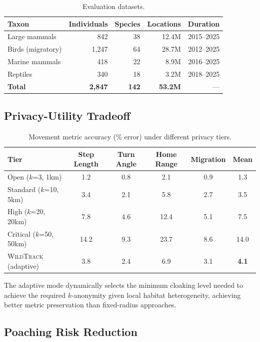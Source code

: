 \documentclass[11pt,letterpaper]{article}
\newcommand{\WildTrack}{\textsc{WildTrack}}
\begin{document}
\begin{table}[htbp]
\centering
\caption{Evaluation datasets.}
\label{tab:eval_datasets}
\begin{tabular}{lrrrr}
\toprule
\textbf{Taxon} & \textbf{Individuals} & \textbf{Species} & \textbf{Locations} & \textbf{Duration} \\
\midrule
Large mammals & 842 & 38 & 12.4M & 2015--2025 \\
Birds (migratory) & 1,247 & 64 & 28.7M & 2012--2025 \\
Marine mammals & 418 & 22 & 8.9M & 2016--2025 \\
Reptiles & 340 & 18 & 3.2M & 2018--2025 \\
\midrule
\textbf{Total} & \textbf{2,847} & \textbf{142} & \textbf{53.2M} & --- \\
\bottomrule
\end{tabular}
\end{table}

\subsection{Privacy-Utility Tradeoff}

\begin{table}[htbp]
\centering
\caption{Movement metric accuracy (\% error) under different privacy tiers.}
\label{tab:privacy_utility}
\begin{tabular}{lccccc}
\toprule
\textbf{Tier} & \textbf{Step Length} & \textbf{Turn Angle} & \textbf{Home Range} & \textbf{Migration} & \textbf{Mean} \\
\midrule
Open ($k$=3, 1km) & 1.2 & 0.8 & 2.1 & 0.9 & 1.3 \\
Standard ($k$=10, 5km) & 3.4 & 2.1 & 5.8 & 2.7 & 3.5 \\
High ($k$=20, 20km) & 7.8 & 4.6 & 12.4 & 5.1 & 7.5 \\
Critical ($k$=50, 50km) & 14.2 & 9.3 & 23.7 & 8.6 & 14.0 \\
\midrule
\WildTrack{} (adaptive) & 3.8 & 2.4 & 6.9 & 3.1 & \textbf{4.1} \\
\bottomrule
\end{tabular}
\end{table}

The adaptive mode dynamically selects the minimum cloaking level needed to achieve the required $k$-anonymity given local habitat heterogeneity, achieving better metric preservation than fixed-radius approaches.

\subsection{Poaching Risk Reduction}
\end{document}
